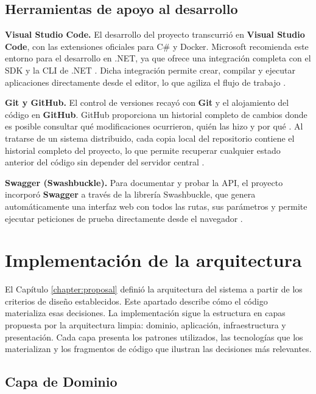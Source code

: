 \subsection{Herramientas de apoyo al desarrollo}

\textbf{Visual Studio Code.} El desarrollo del proyecto transcurrió en \textbf{Visual Studio Code}, con las extensiones oficiales para C\# y Docker. 
Microsoft recomienda este entorno para el desarrollo en .NET, ya que ofrece una integración completa con el SDK y la CLI de .NET \cite{vscode-dotnet}. 
Dicha integración permite crear, compilar y ejecutar aplicaciones directamente desde el editor, lo que agiliza el flujo de trabajo \cite{vscode-csharp}.

\textbf{Git y GitHub.} El control de versiones recayó con \textbf{Git} y el alojamiento del código en \textbf{GitHub}. 
GitHub proporciona un historial completo de cambios donde es posible consultar qué modificaciones ocurrieron, quién las hizo y por qué \cite{github-commits}. 
Al tratarse de un sistema distribuido, cada copia local del repositorio contiene el historial completo del proyecto, lo que permite recuperar cualquier estado anterior del código sin depender del servidor central \cite{pro-git-distributed}.

\textbf{Swagger (Swashbuckle).} Para documentar y probar la API, el proyecto incorporó \textbf{Swagger} a través de la librería Swashbuckle, que genera automáticamente una interfaz web con todos las rutas, sus parámetros y permite ejecutar peticiones de prueba directamente desde el navegador \cite{swagger-ui}.



\section{Implementación de la arquitectura}
\label{section:backend}

El Capítulo \ref{chapter:proposal} definió la arquitectura del sistema a partir de los criterios de diseño establecidos. 
Este apartado describe cómo el código materializa esas decisiones.
La implementación sigue la estructura en capas propuesta por la arquitectura limpia: dominio, aplicación, infraestructura y presentación. 
Cada capa presenta los patrones utilizados, las tecnologías que los materializan y los fragmentos de código que ilustran las decisiones más relevantes.

\subsection{Capa de Dominio}

